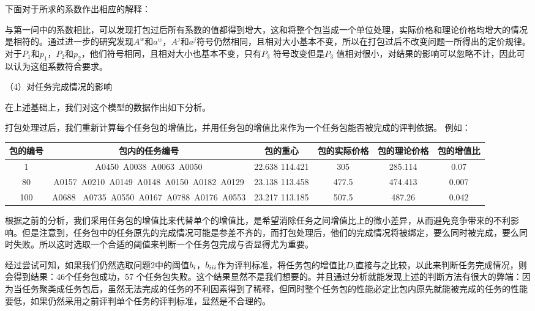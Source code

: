 \documentclass{ctexart}
\begin{document}
   下面对于所求的系数作出相应的解释：


与第一问中的系数相比，可以发现打包过后所有系数的值都得到增大，这和将整个包当成一个单位处理，实际价格和理论价格均增大的情况是相符的。通过进一步的研究发现$A^{w}$和$a^{w}$，$A^{j}$和$a^{j}$符号仍然相同，且相对大小基本不变，所以在打包过后不改变问题一所得出的定价规律。对于$P_{1}$和$p_{1}$，$P_{2}$和$p_{2}$，他们符号相同，且相对大小也基本不变，只有$P_{3}$ 符号改变但是$P_{3}$ 值相对很小，对结果的影响可以忽略不计，因此可以认为这组系数符合要求。



（4）对任务完成情况的影响

在上述基础上，我们对这个模型的数据作出如下分析。

打包处理过后，我们重新计算每个任务包的增值比，并用任务包的增值比来作为一个任务包能否被完成的评判依据。
例如：

\begin{table}[!h]\center\scriptsize
\begin{tabular}{|c|c|c|c|c|c|}
\hline

包的编号	&包内的任务编号	&包的重心&	包的实际价格	&包的理论价格	&包的增值比\\
\hline
1	&A0450\  A0038\  A0063\  A0050	&22.638 114.421&	305	&285.114&	0.07\\
\hline
80&	A0157\   A0210\   A0149\   A0148\   A0150\   A0182\   A0129	&23.138 113.458&	477.5	&474.413	&0.007\\
\hline
100	&A0688 \  A0735\   A0550\   A0167\   A0788\   A0176\   A0553&	23.217 113.185	&507.5	&487.26&	0.042\\
\hline

\end{tabular}
\end{table}




根据之前的分析，我们采用任务包的增值比来代替单个的增值比，是希望消除任务之间增值比上的微小差异，从而避免竞争带来的不利影响。但是注意到，任务包中的任务原先的完成情况可能是参差不齐的，而打包处理后，他们的完成情况将被绑定，要么同时被完成，要么同时失败。所以这时选取一个合适的阈值来判断一个任务包完成与否显得尤为重要。

经过尝试可知，如果我们仍然选取问题2中的阈值$b_{\uppercase\expandafter{\romannumeral1}}$，$b_{\uppercase\expandafter{\romannumeral3}}$作为评判标准，将任务包的增值比$D_{i}$直接与之比较，以此来判断任务完成情况，则会得到结果：46个任务包成功，57 个任务包失败。这个结果显然不是我们想要的。并且通过分析就能发现上述的判断方法有很大的弊端：因为当任务聚类成任务包后，虽然无法完成的任务的不利因素得到了稀释，但同时整个任务包的性能必定比包内原先就能被完成的任务的性能要低，如果仍然采用之前评判单个任务的评判标准，显然是不合理的。
\end{document}
